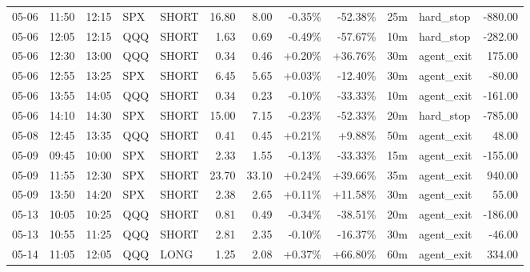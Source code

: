 \documentclass[11pt,a4paper,twoside]{article}
\begin{document}
\begin{center}
\begin{longtable}{>{\color{txtmain}}l l l l l r r r r r >{\color{txtmain}}l r}
05-06 & 11:50 & 12:15 & SPX & SHORT & 16.80 & 8.00 & \textcolor{lossred}{-0.35\%} & \textcolor{lossred}{-52.38\%} & 25m & hard\_stop & \textcolor{lossred}{-880.00} \\
05-06 & 12:05 & 12:15 & QQQ & SHORT & 1.63 & 0.69 & \textcolor{lossred}{-0.49\%} & \textcolor{lossred}{-57.67\%} & 10m & hard\_stop & \textcolor{lossred}{-282.00} \\
05-06 & 12:30 & 13:00 & QQQ & SHORT & 0.34 & 0.46 & \textcolor{wingreen}{+0.20\%} & \textcolor{wingreen}{+36.76\%} & 30m & agent\_exit & \textcolor{wingreen}{175.00} \\
05-06 & 12:55 & 13:25 & SPX & SHORT & 6.45 & 5.65 & \textcolor{wingreen}{+0.03\%} & \textcolor{lossred}{-12.40\%} & 30m & agent\_exit & \textcolor{lossred}{-80.00} \\
05-06 & 13:55 & 14:05 & QQQ & SHORT & 0.34 & 0.23 & \textcolor{lossred}{-0.10\%} & \textcolor{lossred}{-33.33\%} & 10m & agent\_exit & \textcolor{lossred}{-161.00} \\
05-06 & 14:10 & 14:30 & SPX & SHORT & 15.00 & 7.15 & \textcolor{lossred}{-0.23\%} & \textcolor{lossred}{-52.33\%} & 20m & hard\_stop & \textcolor{lossred}{-785.00} \\
05-08 & 12:45 & 13:35 & QQQ & SHORT & 0.41 & 0.45 & \textcolor{wingreen}{+0.21\%} & \textcolor{wingreen}{+9.88\%} & 50m & agent\_exit & \textcolor{wingreen}{48.00} \\
05-09 & 09:45 & 10:00 & SPX & SHORT & 2.33 & 1.55 & \textcolor{lossred}{-0.13\%} & \textcolor{lossred}{-33.33\%} & 15m & agent\_exit & \textcolor{lossred}{-155.00} \\
05-09 & 11:55 & 12:30 & SPX & SHORT & 23.70 & 33.10 & \textcolor{wingreen}{+0.24\%} & \textcolor{wingreen}{+39.66\%} & 35m & agent\_exit & \textcolor{wingreen}{940.00} \\
05-09 & 13:50 & 14:20 & SPX & SHORT & 2.38 & 2.65 & \textcolor{wingreen}{+0.11\%} & \textcolor{wingreen}{+11.58\%} & 30m & agent\_exit & \textcolor{wingreen}{55.00} \\
05-13 & 10:05 & 10:25 & QQQ & SHORT & 0.81 & 0.49 & \textcolor{lossred}{-0.34\%} & \textcolor{lossred}{-38.51\%} & 20m & agent\_exit & \textcolor{lossred}{-186.00} \\
05-13 & 10:55 & 11:25 & QQQ & SHORT & 2.81 & 2.35 & \textcolor{lossred}{-0.10\%} & \textcolor{lossred}{-16.37\%} & 30m & agent\_exit & \textcolor{lossred}{-46.00} \\
05-14 & 11:05 & 12:05 & QQQ & LONG & 1.25 & 2.08 & \textcolor{wingreen}{+0.37\%} & \textcolor{wingreen}{+66.80\%} & 60m & agent\_exit & \textcolor{wingreen}{334.00} \\

\end{longtable}
\end{center}
\end{document}
